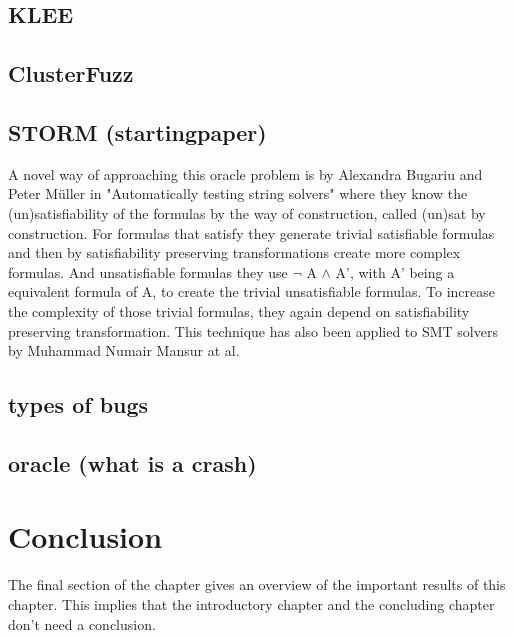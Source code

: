 \subsection{KLEE}
\subsection{ClusterFuzz}
\subsection{STORM (startingpaper)}
A novel way of approaching this oracle problem is by Alexandra Bugariu and Peter M\"uller in "Automatically testing string solvers"\cite{9bugariu2020automaticallyTestingStringSolvers} where they know the (un)satisfiability of the formulas by the way of construction, called (un)sat by construction.  For formulas that satisfy they generate trivial satisfiable formulas and then by satisfiability preserving transformations create more complex formulas. And unsatisfiable formulas they use $\neg$ A $\land$ A', with A' being a equivalent formula of A, to create the trivial unsatisfiable formulas. To increase the complexity of those trivial formulas, they again depend on satisfiability preserving transformation.
This technique has also been applied to SMT solvers by Muhammad Numair Mansur at al.\cite{1mansur2020detecting}

\subsection{types of bugs} \cite{1mansur2020detecting}

\subsection{oracle (what is a crash)}

\section{Conclusion}
The final section of the chapter gives an overview of the important results
of this chapter. This implies that the introductory chapter and the
concluding chapter don't need a conclusion.


